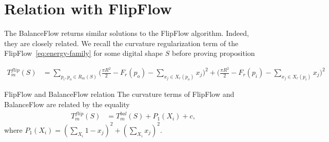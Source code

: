 \section{Relation with FlipFlow}
	The BalanceFlow returns similar solutions to the FlipFlow algorithm. Indeed, they are closely related. We recall the curvature regularization term of the FlipFlow~\cref{eq:energy-family} for some digital shape $S$ before proving proposition

\begin{align}
T_{m}^{flip}(S) &= \sum_{ p_i,p_o \in R_m(S)}{ \Big( \frac{\pi R^2}{2} - F_r(p_o) - \sum_{x_j \in X_r(p_o)}{x_j}\Big)^2 + \Big(\frac{\pi R^2}{2} - F_r(p_i) - \sum_{x_j \in X_r(p_i)}{x_j}\Big)^2 }
\label{eq:curvature-term}
\end{align}

\begin{proposition}{FlipFlow and BalanceFlow relation}
The curvature terms of FlipFlow and BalanceFlow are related by the equality
\begin{align*}
T_{m}^{flip}(S) &= T_{m}^{bal}(S) + P_1(X_i) + c,
\end{align*}
where $P_1(X_i) = (\sum_{X_i}{ 1-x_j})^2 + (\sum_{X_i}{x_j})^2.$
\label{prop:flipflow-balanceflow-relation}
\end{proposition}

